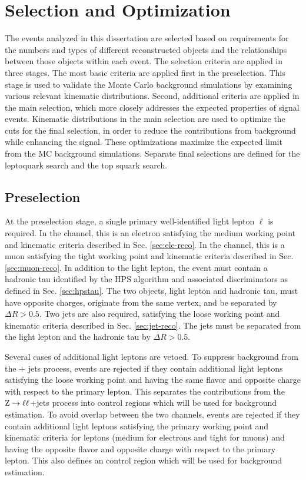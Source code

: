 \section{Selection and Optimization}

The events analyzed in this dissertation are selected based on requirements for the numbers and types of different reconstructed objects and the relationships between those objects within each event. The selection criteria are applied in three stages. The most basic criteria are applied first in the preselection. This stage is used to validate the Monte Carlo background simulations by examining various relevant kinematic distributions. Second, additional criteria are applied in the main selection, which more closely addresses the expected properties of signal events. Kinematic distributions in the main selection are used to optimize the cuts for the final selection, in order to reduce the contributions from background while enhancing the signal. These optimizations maximize the expected limit from the MC background simulations. Separate final selections are defined for the leptoquark search and the top squark search.

\subsection{Preselection}

At the preselection stage, a single primary well-identified light lepton $\ell$ is required. In the \etau channel, this is an electron satisfying the medium working point and kinematic criteria described in Sec. \ref{sec:ele-reco}. In the \mutau channel, this is a muon satisfying the tight working point and kinematic criteria described in Sec. \ref{sec:muon-reco}. In addition to the light lepton, the event must contain a hadronic tau identified by the HPS algorithm and associated discriminators as defined in Sec. \ref{sec:hpstau}. The two objects, light lepton and hadronic tau, must have opposite charges, originate from the same vertex, and be separated by $\Delta R > 0.5$. Two jets are also required, satisfying the loose working point and kinematic criteria described in Sec. \ref{sec:jet-reco}. The jets must be separated from the light lepton and the hadronic tau by $\Delta R > 0.5$.

Several cases of additional light leptons are vetoed. To suppress background from the \Z + jets process, events are rejected if they contain additional light leptons satisfying the loose working point and having the same flavor and opposite charge with respect to the primary lepton. This separates the contributions from the $\mathrm{Z} \rightarrow \ell\ell$+jets process into control regions which will be used for background estimation. To avoid overlap between the two channels, events are rejected if they contain additional light leptons satisfying the primary working point and kinematic criteria for leptons (medium for electrons and tight for muons) and having the opposite flavor and opposite charge with respect to the primary lepton. This also defines an \emu control region which will be used for background estimation.

